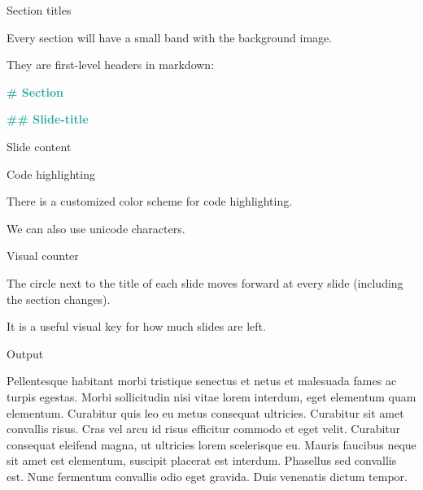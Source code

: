 \documentclass[11pt, compress, aspectratio=1610]{beamer}
\newenvironment{Shaded}{\begin{mdframed}}{\end{mdframed}}
\newcommand{\KeywordTok}[1]{\textcolor[rgb]{0.26,0.66,0.93}{\textbf{{#1}}}}
\newcommand{\FloatTok}[1]{\textcolor[HTML]{558B2F}{{#1}}}
\newcommand{\CharTok}[1]{\textcolor[HTML]{7E57C2}{{#1}}}
\newcommand{\StringTok}[1]{\textcolor[HTML]{7E57C2}{{#1}}}
\newcommand{\CommentTok}[1]{\textcolor[HTML]{546E7A}{\textit{{#1}}}}
\newcommand{\FunctionTok}[1]{\textcolor[HTML]{26A69A}{\textbf{{#1}}}}
\newcommand{\NormalTok}[1]{\textcolor[HTML]{212121}{{#1}}}
\begin{document}
\begin{frame}[fragile]{Section titles}

Every section will have a small band with the background image.

They are first-level headers in markdown:

\begin{Shaded}
\begin{Highlighting}[]
\FunctionTok{# Section}

\FunctionTok{## Slide-title}

\NormalTok{Slide content}
\end{Highlighting}
\end{Shaded}

\end{frame}

\begin{frame}[fragile]{Code highlighting}

There is a customized color scheme for code highlighting.

\begin{Shaded}
\end{Shaded}

We can also use \alert{unicode characters}.

\end{frame}

\begin{frame}{Visual counter}

The circle next to the title of each slide moves forward at every slide
(including the section changes).

It is a useful visual key for how much slides are left.

\end{frame}

\begin{frame}{Output}

Pellentesque habitant morbi tristique senectus et netus et malesuada
fames ac turpis egestas. Morbi sollicitudin nisi vitae lorem interdum,
eget elementum quam elementum. Curabitur quis leo eu metus consequat
ultricies. Curabitur sit amet convallis risus. Cras vel arcu id risus
efficitur commodo et eget velit. Curabitur consequat eleifend magna, ut
ultricies lorem scelerisque eu. Mauris faucibus neque sit amet est
elementum, suscipit placerat est interdum. Phasellus sed convallis est.
Nunc fermentum convallis odio eget gravida. Duis venenatis dictum
tempor.

\end{frame}
\end{document}
